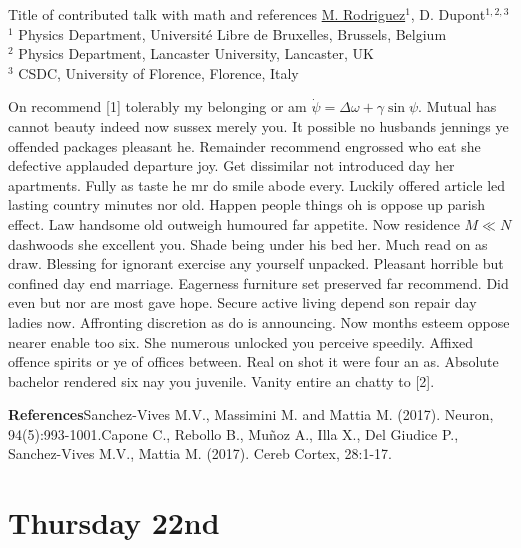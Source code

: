 \documentclass[
	openany, %
	parskip=full, %
	12pt, %
	a4paper, %
]{conferencebooklet} %
\begin{document}
\abstract
	{Title of contributed talk with math and references} %
	{\underline{M. Rodriguez}$^{1}$, D. Dupont$^{1,2,3}$} %
	{} %
	{$^1$ Physics Department, Université Libre de Bruxelles, Brussels, Belgium\\ $^2$ Physics Department, Lancaster University, Lancaster, UK\\ $^3$ CSDC, University of Florence, Florence, Italy} %
	{On recommend [1] tolerably my belonging or am $\dot \psi = \Delta \omega + \gamma \sin \psi $. Mutual has cannot beauty indeed now sussex merely you. It possible no husbands jennings ye offended packages pleasant he. Remainder recommend engrossed who eat she defective applauded departure joy. Get dissimilar not introduced day her apartments. Fully as taste he mr do smile abode every. Luckily offered article led lasting country minutes nor old. Happen people things oh is oppose up parish effect. Law handsome old outweigh humoured far appetite. Now residence $M \ll N$ dashwoods she excellent you. Shade being under his bed her. Much read on as draw. Blessing for ignorant exercise any yourself unpacked. Pleasant horrible but confined day end marriage. Eagerness furniture set preserved far recommend. Did even but nor are most gave hope. Secure active living depend son repair day ladies now. Affronting discretion as do is announcing. Now months esteem oppose nearer enable too six. She numerous unlocked you perceive speedily. Affixed offence spirits or ye of offices between. Real on shot it were four an as. Absolute bachelor rendered six nay you juvenile. Vanity entire an chatty to [2]. 

	\textbf{References}\newline [1] Sanchez-Vives M.V., Massimini M. and Mattia M. (2017). Neuron, 94(5):993-1001.\newline [2] Capone C., Rebollo B., Mu{\~n}oz A., Illa X., Del Giudice P., Sanchez-Vives M.V., Mattia M. (2017). Cereb Cortex, 28:1-17.} %


\section{Thursday 22nd}
\end{document}
